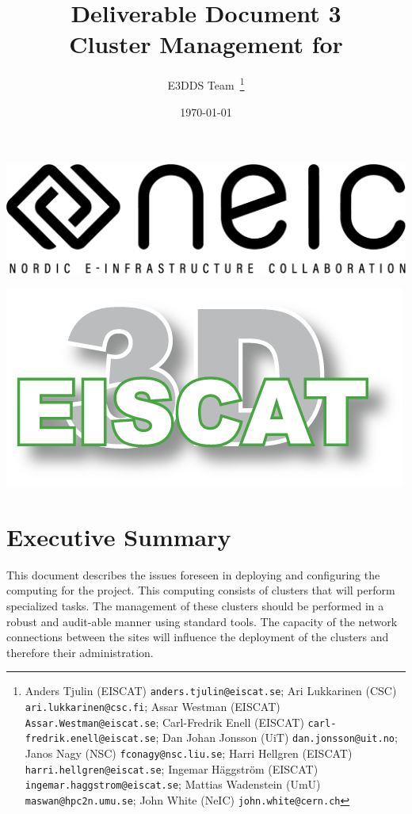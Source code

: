 \documentclass[12pt,a4paper]{article}
\title{
{\bf Deliverable Document 3} \\
Cluster Management for \ED}
\author{E3DDS Team~\footnote{
Anders Tjulin (EISCAT) {\tt anders.tjulin@eiscat.se};
Ari Lukkarinen (CSC) {\tt ari.lukkarinen@csc.fi};
Assar Westman (EISCAT) {\tt Assar.Westman@eiscat.se};
Carl-Fredrik Enell (EISCAT) {\tt carl-fredrik.enell@eiscat.se};
Dan Johan Jonsson (UiT) {\tt dan.jonsson@uit.no};
Janos Nagy (NSC) {\tt fconagy@nsc.liu.se};
Harri Hellgren (EISCAT) {\tt harri.hellgren@eiscat.se};
Ingemar H\"{a}ggstr\"{o}m (EISCAT) {\tt ingemar.haggstrom@eiscat.se};
Mattias Wadenstein (UmU) {\tt maswan@hpc2n.umu.se};
John White (NeIC) {\tt john.white@cern.ch}}}
\date{\today}
\begin{document}
\pagestyle{fancy}

\maketitle
\par\noindent
\begin{minipage}{0.5\textwidth}
  \includegraphics[scale=0.18]{NEIC_logo_screen_black.pdf}
\end{minipage}
\begin{minipage}{0.5\textwidth}
  \hfill
  \includegraphics[width=0.75\linewidth]{e3d-logo-green-500px}
\end{minipage}

\newpage
\tableofcontents
\newpage

\section{Executive Summary}
\label{exec-summ}


This document describes the issues foreseen in deploying and configuring the computing \einfra for the \ED project. This computing \einfra consists of clusters that will perform specialized tasks.
The management of these clusters should be performed in a robust and audit-able manner using standard tools.
The capacity of the network connections between the sites will influence the deployment of the clusters and therefore their administration.
\end{document}
